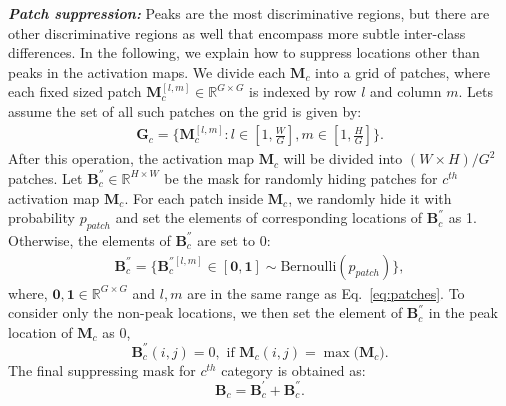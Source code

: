 \documentclass[letterpaper]{article} \usepackage{aaai20}  \usepackage{times}  \usepackage{helvet} \usepackage{courier}  \usepackage[hyphens]{url}  \usepackage{graphicx} \usepackage{multirow}
\begin{document}
\textbf{\textit{Patch suppression:}}
Peaks are the most discriminative regions, but there are other discriminative regions as well that encompass more subtle inter-class differences. In the following, we explain how to suppress locations other than peaks in the activation maps. We divide each $\mathbf{M}_{c}$ into a grid of patches, where each fixed sized patch $\mathbf{M}_c^{[l,m]} \in \mathbb{R}^{G\times G}$ is indexed by row $l$ and column $m$. Lets assume the set of all such patches on the grid is given by:
\begin{align}\label{eq:patches}
    \mathbf{G}_c = \{\mathbf{M}_c^{[l,m]} : l \in [1,\frac{W}{G}], m \in [1,\frac{H}{G}]\}.
\end{align}
After this operation, the activation map $\mathbf{M}_{c}$ will be divided into $(W\times H)/G^2$ patches. Let $\mathbf{B}^{''}_{c} \in \mathbb{R}^{H\times W}$ be the mask for randomly hiding patches for $c^{th}$ activation map $\mathbf{M}_{c}$.  For each patch inside $\mathbf{M}_{c}$, we randomly hide it with probability $p_{patch}$ and set the elements of corresponding locations of $\mathbf{B}^{''}_{c} $ as 1. Otherwise, the elements of $\mathbf{B}^{''}_{c}$ are set to $0$:
\begin{align}
    \mathbf{B}^{''}_{c} = \{ \mathbf{B}^{''[l,m]}_{c} \in [\mathbf{0}, \mathbf{1}] \sim \text{Bernoulli}(p_{patch})\},
\end{align}
where, $\mathbf{0},\mathbf{1}\in \mathbb{R}^{G\times G}$ and $l,m$ are in the same range as Eq.~\ref{eq:patches}. To consider only the non-peak locations, we then set the element of $\mathbf{B}^{''}_{c}$ in the peak location of $\mathbf{M}_{c}$ as 0,
\begin{equation}
    \mathbf{B}^{''}_{c}(i,j)=0, \text{ if $\mathbf{M}_{c}(i,j)=\max(\mathbf{M}_{c}$)}.
\end{equation}
The final suppressing mask for $c^{th}$ category is obtained as:
\begin{equation}
    \mathbf{B}_c=\mathbf{B}^{'}_{c}+\mathbf{B}^{''}_{c}.
\end{equation}
\end{document}
